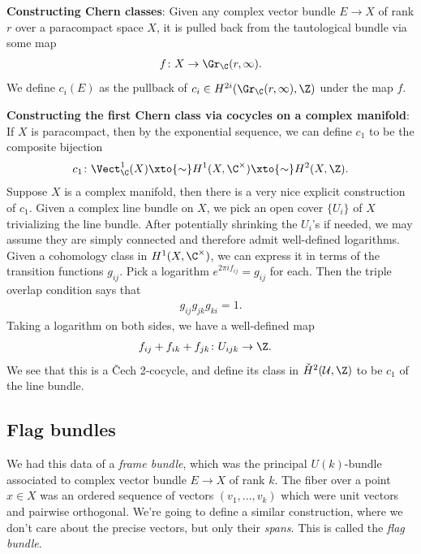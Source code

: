 \documentclass[11pt]{book}
\begin{document}
\textbf{Constructing Chern classes}: Given any complex vector bundle $E\to X$ of rank $r$ over a paracompact space $X$, it is pulled back from the tautological bundle via some map
\begin{align*}
    f \colon X \to \Gr_\C(r,\infty).
\end{align*}
We define $c_i(E)$ as the pullback of $c_i \in H^{2i}(\Gr_\C(r,\infty),\Z)$ under the map $f$.

\textbf{Constructing the first Chern class via cocycles on a complex manifold}: If $X$ is paracompact, then by the exponential sequence, we can define $c_1$ to be the composite bijection
\begin{align*}
    c_1 \colon \Vect_\C^1(X) \xto{\sim} H^1(X,\C^\times) \xto{\sim} H^2(X,\Z).
\end{align*}
Suppose $X$ is a complex manifold, then there is a very nice explicit construction of $c_1$. Given a complex line bundle on $X$, we pick an open cover $\{U_i\}$ of $X$ trivializing the line bundle. After potentially shrinking the $U_i$'s if needed, we may assume they are simply connected and therefore admit well-defined logarithms. Given a cohomology class in $H^1(X,\C^\times)$, we can express it in terms of the transition functions $g_{ij}$. Pick a logarithm $e^{2\pi i f_{ij}} = g_{ij}$ for each. Then the triple overlap condition says that
\begin{align*}
    g_{ij} g_{jk} g_{ki} = 1.
\end{align*}
Taking a logarithm on both sides, we have a well-defined map
\begin{align*}
    f_{ij} + f_{ik} + f_{jk} \colon U_{ijk} &\to \Z.
\end{align*}
We see that this is a \v{C}ech 2-cocycle, and define its class in $\check{H}^2(\mathcal{U},\Z)$ to be $c_1$ of the line bundle.

\subsection{Flag bundles}

We had this data of a \emph{frame bundle}, which was the principal $U(k)$-bundle associated to complex vector bundle $E \to X$ of rank $k$. The fiber over a point $x \in X$ was an ordered sequence of vectors $(v_1, \ldots, v_k)$ which were unit vectors and pairwise orthogonal. We're going to define a similar construction, where we don't care about the precise vectors, but only their \emph{spans}. This is called the \emph{flag bundle}.
\end{document}
